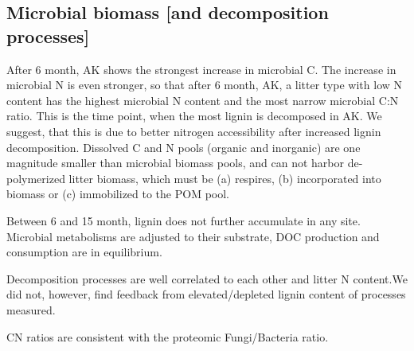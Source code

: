 

\subsection{Microbial biomass [and decomposition processes]}

After 6 month, AK shows the strongest increase in microbial C. The increase in microbial N is even stronger,  so that after 6 month, AK, a litter type with low N content has the highest microbial N content and the most narrow microbial C:N ratio. This is the time point, when the most lignin is decomposed in AK. We suggest, that this is due to better nitrogen accessibility after increased lignin decomposition. Dissolved C and N pools (organic and inorganic) are one magnitude smaller than microbial biomass pools, and can not harbor de-polymerized litter biomass, which must be (a) respires, (b) incorporated into biomass or (c) immobilized to the POM pool. 

Between 6 and 15 month, lignin does not further accumulate in any site. Microbial metabolisms are adjusted to their substrate, DOC production and consumption are in equilibrium.

Decomposition processes are well correlated to each other and litter N content.We did not, however, find feedback from elevated/depleted lignin content of processes measured.

CN ratios are consistent with the proteomic Fungi/Bacteria ratio. 